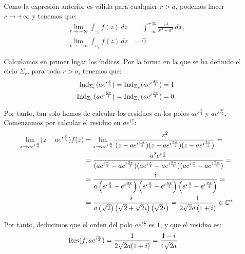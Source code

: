 \begin{ejercicio}
    Como la expresión anterior es válida para cualquier $r > a$, podemos hacer $r \to +\infty$ y tenemos que:
    \begin{align*}
        \lim_{r\to+\infty} \int_{\gamma_r} f(z) \, dz &= \int_{-\infty}^{+\infty} \frac{x^2}{x^4 + a^4} \, dx, \\
        \lim_{r\to+\infty} \int_{\sigma_r} f(z) \, dz &= 0.
    \end{align*}

    Calculamos en primer lugar los índices. Por la forma en la que se ha definido el ciclo $\Sigma_r$, para todo $r>a$, tenemos que:
    \begin{align*}
        \operatorname{Ind}_{\Sigma_r}(a e^{i\frac{\pi}{4}}) &= \operatorname{Ind}_{\Sigma_r}(a e^{i\frac{3\pi}{4}}) = 1\\
        \operatorname{Ind}_{\Sigma_r}(a e^{i\frac{5\pi}{4}}) &= \operatorname{Ind}_{\Sigma_r}(a e^{i\frac{7\pi}{4}}) = 0.
    \end{align*}

    Por tanto, tan solo hemos de calcular los residuos en los polos $a e^{i\frac{\pi}{4}}$ y $a e^{i\frac{3\pi}{4}}$. Comenzamos por calcular el residuo en $a e^{i\frac{\pi}{4}}$:
    \begin{align*}
        \lim_{z\to a e^{i\frac{\pi}{4}}} (z - a e^{i\frac{\pi}{4}})f(z) &= \lim_{z\to a e^{i\frac{\pi}{4}}} \frac{z^2}{(z-a e^{i\frac{3\pi}{4}})(z-a e^{i\frac{5\pi}{4}})(z-a e^{i\frac{7\pi}{4}})}
        =\\&= \dfrac{a^2e^{i\frac{\pi}{2}}}{(a e^{i\frac{\pi}{4}} - a e^{i\frac{3\pi}{4}})(a e^{i\frac{\pi}{4}} - a e^{i\frac{5\pi}{4}})(a e^{i\frac{\pi}{4}} - a e^{i\frac{7\pi}{4}})}
        =\\&= \dfrac{i}{a\left(e^{i\frac{\pi}{4}} - e^{i\frac{3\pi}{4}}\right)\left(e^{i\frac{\pi}{4}} - e^{i\frac{5\pi}{4}}\right)\left(e^{i\frac{\pi}{4}} - e^{i\frac{7\pi}{4}}\right)}
        =\\&= \dfrac{i}{a\left(\sqrt{2}\right)\left(\sqrt{2} + \sqrt{2}i\right)\left(\sqrt{2}i\right)}
        = \dfrac{1}{2\sqrt{2}a\left(1 + i\right)}\in \mathbb{C}^*
    \end{align*}

    Por tanto, deducimos que el orden del polo $a e^{i\frac{\pi}{4}}$ es $1$, y que el residuo es:
    \begin{align*}
        \operatorname{Res}(f, a e^{i\frac{\pi}{4}}) &= \dfrac{1}{2\sqrt{2}a(1 + i)}
        = \dfrac{1-i}{4\sqrt{2}a}
    \end{align*}


\end{ejercicio}
